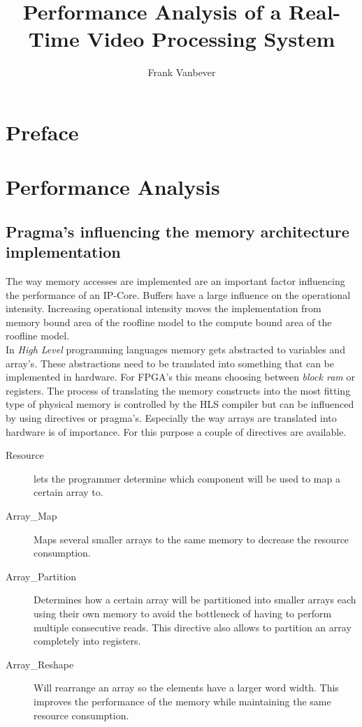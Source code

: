 \documentclass[a4paper]{report}
\title{Performance Analysis of a Real-Time Video Processing System}
\author{Frank Vanbever}
\begin{document}
\maketitle

\tableofcontents

\listoffigures

\listoftables


\chapter{Preface}
\chapter{Performance Analysis}

\section{Pragma's influencing the memory architecture implementation}

The way memory accesses are implemented are an important factor influencing the performance of an IP-Core. Buffers have a large influence on the operational intensity. Increasing operational intensity moves the implementation from memory bound area of the roofline model to the compute bound area of the roofline model.\\
In \emph{High Level} programming languages memory gets abstracted to variables and array's. These abstractions need to be translated into something that can be implemented in hardware. For FPGA's this means choosing between \emph{block ram} or registers. The process of translating the memory constructs into the most fitting type of physical memory is controlled by the HLS compiler but can be influenced by using directives or pragma's. Especially the way arrays are translated into hardware is of importance. For this purpose a couple of directives are available.\\

\begin{description}

\item[Resource] lets the programmer determine which component will be used to map a certain array to.

\item[Array\_Map] Maps several smaller arrays to the same memory to decrease the resource consumption.

\item[Array\_Partition] Determines how a certain array will be partitioned into smaller arrays each using their own memory to avoid the bottleneck of having to perform multiple consecutive reads. This directive also allows to partition an array completely into registers.

\item[Array\_Reshape] Will rearrange an array so the elements have a larger word width. This improves the performance of the memory while maintaining the same resource consumption.

\end{description}
\end{document}
